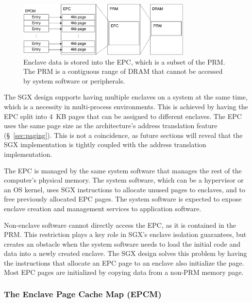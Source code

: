 \begin{figure}[hbt]
  \centering
  \includegraphics[width=87mm]{figures/sgx_epc.pdf}
  \caption{
    Enclave data is stored into the EPC, which is a subset of the PRM. The
    PRM is a contiguous range of DRAM that cannot be accessed by system
    software or peripherals.
  }
  \label{fig:sgx_epc}
\end{figure}

The SGX design supports having multiple enclaves on a system at the same time,
which is a necessity in multi-process environments. This is achieved by having
the EPC split into 4~KB pages that can be assigned to different enclaves. The
EPC uses the same page size as the architecture's address translation feature
(\S~\ref{sec:paging}). This is not a coincidence, as future sections will
reveal that the SGX implementation is tightly coupled with the address
translation implementation.

The EPC is managed by the same system software that manages the rest of the
computer's physical memory. The system software, which can be a hypervisor or
an OS kernel, uses SGX instructions to allocate unused pages to enclaves, and
to free previously allocated EPC pages. The system software is expected to
expose enclave creation and management services to application software.

Non-enclave software cannot directly access the EPC, as it is contained in the
PRM. This restriction plays a key role in SGX's enclave isolation guarantees,
but creates an obstacle when the system software needs to load the initial code
and data into a newly created enclave. The SGX design solves this problem by
having the instructions that allocate an EPC page to an enclave also initialize
the page. Most EPC pages are initialized by copying data from a non-PRM memory
page.


\subsubsection{The Enclave Page Cache Map (EPCM)}
\label{sec:sgx_epcm}


